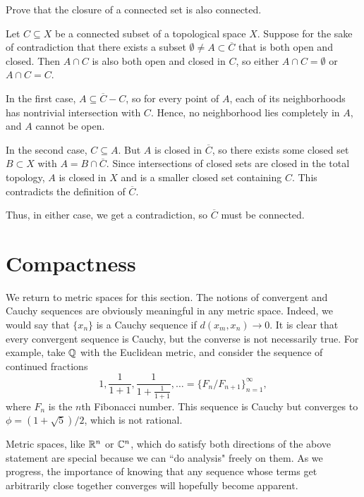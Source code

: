 \begin{exercise}
	Prove that the closure of a connected set is also connected.
	
	\begin{sol}
		Let $C \subseteq X$ be a connected subset of a topological space $X$. Suppose for the sake of contradiction that there exists a subset $\emptyset \neq A \subset \overline{C}$ that is both open and closed. Then $A \cap C$ is also both open and closed in $C$, so either $A \cap C=\emptyset$ or $A \cap C=C$.
		
		In the first case, $A \subseteq \overline{C}-C$, so for every point of $A$, each of its neighborhoods has nontrivial intersection with $C$. Hence, no neighborhood lies completely in $A$, and $A$ cannot be open.
		
		In the second case, $C \subseteq A$. But $A$ is closed in $\overline{C}$, so there exists some closed set $B \subset X$ with $A=B \cap \overline{C}$. Since intersections of closed sets are closed in the total topology, $A$ is closed in $X$ and is a smaller closed set containing $C$. This contradicts the definition of $\overline{C}$.
		
		Thus, in either case, we get a contradiction, so $\overline{C}$ must be connected.
	\end{sol}
\end{exercise}

\section{Compactness}
We return to metric spaces for this section. The notions of convergent and Cauchy sequences are obviously meaningful in any metric space. Indeed, we would say that $\{x_n\}$ is a Cauchy sequence if $d(x_m,x_n) \rightarrow 0$. It is clear that every convergent sequence is Cauchy, but the converse is not necessarily true. For example, take $\mathbb Q$ with the Euclidean metric, and consider the sequence of continued fractions $$1,\dfrac{1}{1+1},\dfrac{1}{1+\frac{1}{1+1}},\dots=\{F_n/F_{n+1}\}_{n=1}^{\infty},$$ where $F_n$ is the $n$th Fibonacci number. This sequence is Cauchy but converges to $\phi=(1+\sqrt{5})/2$, which is not rational.

Metric spaces, like $\mathbb R^n$ or $\mathbb C^n$, which do satisfy both directions of the above statement are special because we can ``do analysis" freely on them. As we progress, the importance of knowing that any sequence whose terms get arbitrarily close together converges will hopefully become apparent.


